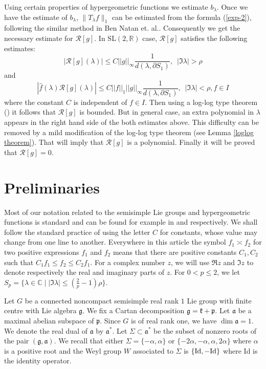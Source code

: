 \documentclass[11pt,reqno]{amsart}
\newcommand{\R}{\mathbb R}%
\newcommand{\C}{\mathbb C}%
\theoremstyle{definition}
\theoremstyle{definition}
\numberwithin{equation}{section}
\begin{document}
Using certain properties of hypergeometric functions we estimate $b_\lambda$. Once we have the estimate of $b_\lambda$,  $\|T_\lambda f\|_1$ can be estimated from the formula (\ref{exp-2}), following the similar method in Ben Natan et. al.. Consequently we get the necessary estimate for $\mathcal R[g]$.
In $\mathrm{SL}(2, \R)$ case, $\mathcal R[g]$ satisfies the following estimates: 
$$\left|\mathcal{R}[g](\lambda)\right|\leq C||g||_\infty\frac{1}{d(\lambda,\partial S_1)},\,\,\, |\Im\lambda|>\rho$$
and 
 $$\left|\widehat{f}(\lambda)\mathcal{R}[g](\lambda)\right|\leq C||f||_1||g||_\infty\frac{1}{d(\lambda,\partial S_1)}, \,\,\, |\Im\lambda|<\rho, f\in I$$ where the constant $C$ is independent of $f\in I$. 
Then using a log-log type theorem (\cite[Theorem 5.3]{Ben-2}) it follows that $\mathcal R[g]$ is bounded.
But in general case, an extra polynomial in $\lambda$ appears in the right hand side of the both estimates above. This  difficulty can be removed by a  mild modification of  the log-log type theorem (see Lemma \ref{loglog theorem}). 
That will imply that $\mathcal R[g]$ is a polynomial. Finally it will be proved that $\mathcal R[g]=0$. 




\section{Preliminaries}
Most of our notation related to the semisimple
Lie groups and hypergeometric functions is standard and  can be found for example in
\cite{Helga-GGA, GV} and \cite{Koornwinder} respectively. 
We shall follow the standard practice of using the letter $C$ for constants, whose value may change from one line to another. Everywhere in this article the symbol
$f_1\asymp f_2$ for two positive expressions $f_1$ and $f_2$ means that there are positive constants $C_1, C_2$ such
that $C_1f_1\leq f_2\leq C_2f_1$. For a complex number $z$, we will use $\Re z$ and $\Im z$ to
denote respectively the real and imaginary parts of $z$. For $0<p\leq 2$, we let $S_p=\{\lambda\in\C\mid |\Im\lambda|\leq (\frac 2p-1)\rho\}$.


Let $G$ be a connected noncompact semisimple real rank $1$ Lie group with finite centre with Lie algebra $\mathfrak g$.
We fix a Cartan decomposition $\mathfrak g= \mathfrak k+ \mathfrak p$. Let
 $\mathfrak a$ be a maximal abelian subspace of $\mathfrak p$. Since $G$ is of real rank one, we have $\dim\mathfrak a=1$. We denote the real dual of $\mathfrak a$ by  $\mathfrak a^*$. Let $\Sigma\subset \mathfrak a^*$ be the subset of nonzero roots of the pair $(\mathfrak g,\mathfrak a)$. We recall that either $\Sigma=\{-\alpha, \alpha\}$ or $\{-2\alpha, -\alpha, \alpha, 2\alpha\}$ where $\alpha$ is a positive root and the Weyl group $W$ associated  to $\Sigma$ is $\{{\rm Id}, -{\rm Id}\}$ where Id is the identity operator.
 
\end{document}

